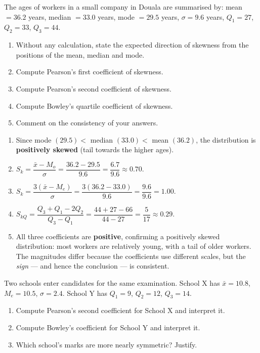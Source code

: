 \documentclass[11pt]{article}
\begin{document}
\begin{exercice}
The ages of workers in a small company in Douala are summarised by: mean $= 36.2$ years, median $= 33.0$ years, mode $= 29.5$ years, $\sigma = 9.6$ years, $Q_1 = 27$, $Q_2 = 33$, $Q_3 = 44$.
\begin{enumerate}
\item Without any calculation, state the expected direction of skewness from the positions of the mean, median and mode.
\item Compute Pearson's first coefficient of skewness.
\item Compute Pearson's second coefficient of skewness.
\item Compute Bowley's quartile coefficient of skewness.
\item Comment on the consistency of your answers.
\end{enumerate}
\end{exercice}

\begin{corrige}[Exercise 1]
\begin{enumerate}
\item Since mode $(29.5) <$ median $(33.0) <$ mean $(36.2)$, the distribution is \textbf{positively skewed} (tail towards the higher ages).
\item $S_k = \dfrac{\bar{x} - M_o}{\sigma} = \dfrac{36.2 - 29.5}{9.6} = \dfrac{6.7}{9.6} \approx 0.70$.
\item $S_k = \dfrac{3(\bar{x} - M_e)}{\sigma} = \dfrac{3(36.2 - 33.0)}{9.6} = \dfrac{9.6}{9.6} = 1.00$.
\item $S_{kQ} = \dfrac{Q_3 + Q_1 - 2Q_2}{Q_3 - Q_1} = \dfrac{44 + 27 - 66}{44 - 27} = \dfrac{5}{17} \approx 0.29$.
\item All three coefficients are \textbf{positive}, confirming a positively skewed distribution: most workers are relatively young, with a tail of older workers. The magnitudes differ because the coefficients use different scales, but the \emph{sign} — and hence the conclusion — is consistent.
\end{enumerate}
\end{corrige}

\begin{exercice}
Two schools enter candidates for the same examination. School X has $\bar{x} = 10.8$, $M_e = 10.5$, $\sigma = 2.4$. School Y has $Q_1 = 9$, $Q_2 = 12$, $Q_3 = 14$.
\begin{enumerate}
\item Compute Pearson's second coefficient for School X and interpret it.
\item Compute Bowley's coefficient for School Y and interpret it.
\item Which school's marks are more nearly symmetric? Justify.
\end{enumerate}
\end{exercice}
\end{document}
